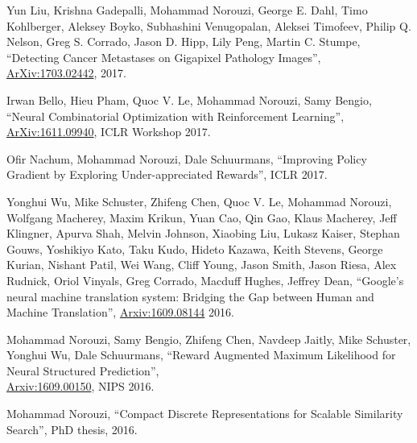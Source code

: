 \documentclass[10pt,letterpaper]{article}
\renewenvironment{itemize}{
  \begin{list}{}{
    \setlength{\leftmargin}{1.5em}
  }
}{
  \end{list}
}
\begin{document}
\begin{itemize}
\item Yun Liu, Krishna Gadepalli, Mohammad Norouzi, George E. Dahl, Timo Kohlberger, Aleksey Boyko, Subhashini Venugopalan, Aleksei Timofeev, Philip Q. Nelson, Greg S. Corrado, Jason D. Hipp, Lily Peng, Martin C. Stumpe,
``Detecting Cancer Metastases on Gigapixel Pathology Images'',\\
\href{https://arxiv.org/pdf/1703.02442}{ArXiv:1703.02442}, 2017.

\item Irwan Bello, Hieu Pham, Quoc V. Le, Mohammad Norouzi, Samy Bengio,
``Neural Combinatorial Optimization with Reinforcement Learning'',
\href{https://arxiv.org/pdf/1611.09940}{ArXiv:1611.09940}, ICLR Workshop 2017.

\item Ofir Nachum, Mohammad Norouzi, Dale Schuurmans,
``Improving Policy Gradient by Exploring Under-appreciated Rewards'',
ICLR 2017.

\item
Yonghui Wu, Mike Schuster, Zhifeng Chen, Quoc V. Le, Mohammad Norouzi, Wolfgang Macherey, Maxim Krikun, Yuan Cao, Qin Gao, Klaus Macherey, Jeff Klingner, Apurva Shah, Melvin Johnson, Xiaobing Liu, Lukasz Kaiser, Stephan Gouws, Yoshikiyo Kato, Taku Kudo, Hideto Kazawa, Keith Stevens, George Kurian, Nishant Patil, Wei Wang, Cliff Young, Jason Smith, Jason Riesa, Alex Rudnick, Oriol Vinyals, Greg Corrado, Macduff Hughes, Jeffrey Dean,
``Google's neural machine translation system: Bridging the Gap between Human and Machine Translation'',
\href{https://arxiv.org/pdf/1609.08144}{Arxiv:1609.08144} 2016.
  
\item
Mohammad Norouzi, Samy Bengio, Zhifeng Chen, Navdeep Jaitly, Mike Schuster, Yonghui Wu, Dale Schuurmans,
``Reward Augmented Maximum Likelihood for Neural Structured Prediction'',\\
\href{https://arxiv.org/pdf/1609.00150.pdf}{Arxiv:1609.00150}, NIPS 2016.

\item
Mohammad Norouzi, ``Compact Discrete Representations for Scalable Similarity Search'',
PhD thesis, 2016.


\end{itemize}
\end{document}
